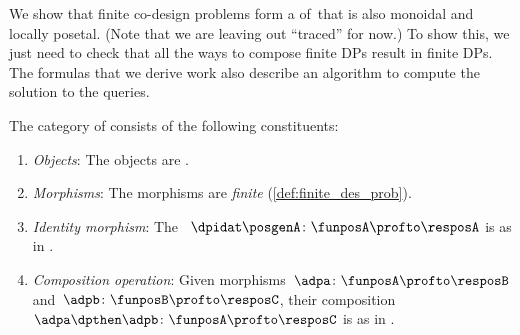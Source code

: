 We show that finite co-design problems form a  of~\DP that is also monoidal and locally posetal.
(Note that we are leaving out ``traced'' for now.) To show this, we just need to check that all the ways to compose finite DPs result in finite DPs.
The formulas that we derive work also describe an algorithm to compute the solution to the queries.
\begin{definition}
    \label{def:DPfinite}
    The category of  \DPfinite consists of the following constituents:
    \begin{enumerate}
        \item \emph{Objects}: The objects are .
        \item \emph{Morphisms}: The morphisms are \emph{finite}  (\cref{def:finite_des_prob}).
        \item \emph{Identity morphism}: The ~$\dpidat\posgenA \colon \funposA \profto \resposA$ is as in \DP.
        \item \emph{Composition operation}: Given morphisms~$\adpa \colon  \funposA \profto \resposB$ and~$\adpb \colon \funposB \profto \resposC$, their composition~$\adpa \dpthen \adpb\colon \funposA\profto \resposC$ is as in \DP.
    \end{enumerate}
\end{definition}
